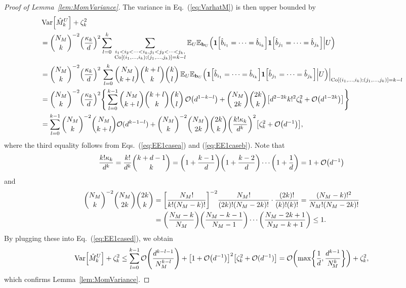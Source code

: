\documentclass[aps,prl,twocolumn,nofootinbib,superscriptaddress,10pt]{revtex4-2}
\let\originalleft\left
\let\originalright\right
\renewcommand{\left}{\mathopen{}\mathclose\bgroup\originalleft}
\renewcommand{\right}{\aftergroup\egroup\originalright}
\def\E{ {\mathbb E} } %
\DeclareMathOperator{\Var}{Var}
\newcommand{\bigo}[1]{\mathcal{O}\left(#1\right)}
\theoremstyle{plain}
\theoremstyle{definition}
\def\eqref#1{\textup{(\ref{#1})}}
\newcommand{\eref}[1]{Eq.~\textup{(\ref{#1})}}
\newcommand{\lref}[1]{Lemma~\ref{#1}}
\begin{document}
\begin{proof}[Proof of \lref{lem:MomVariance}]
The variance in \eref{eq:VarhatM}  is then upper bounded by
\begin{align}\label{eq:EE1cased}
&\Var\left[ \hat{M}_k^{U}\right] +\zeta_k^2
\nonumber\\
&=  
\binom{N_M}{k}^{-2} \left( \frac{\kappa_k}{d}\right)^2
\sum_{l=0}^{k} \,
\sum_{\substack{i_1<i_2<\dots<i_k, j_1<j_2<\dots<j_k, \\{\rm Co}[(i_1,\dots,i_k);(j_1,\dots,j_k)]=k-l }} 
\E_{U} \E_{\mathbf{b}_{U}} \Big(
\textbf{1}\left[\hat{b}_{i_1}=\dots=\hat{b}_{i_k}\right]  
\textbf{1}\left[\hat{b}_{j_1}=\dots=\hat{b}_{j_k}\right]  \Big| U \Big)
\nonumber\\
&= 
\binom{N_M}{k}^{-2} \left( \frac{\kappa_k}{d}\right)^2\,  
\sum_{l=0}^{k} 
\binom{N_M}{k+l} \binom{k+l}{k} \binom{k}{l} \, 
\E_{U} \E_{\mathbf{b}_{U}} \Big(
\textbf{1}\left[\hat{b}_{i_1}=\dots=\hat{b}_{i_k}\right]  
\textbf{1}\left[\hat{b}_{j_1}=\dots=\hat{b}_{j_k}\right]  \Big| U \Big)\Big|_{{\rm Co}[(i_1,\dots,i_k);(j_1,\dots,j_k)]=k-l}
\nonumber\\
&= 
\binom{N_M}{k}^{-2} \left( \frac{\kappa_k}{d}\right)^2
\left\lbrace \,  
\sum_{l=0}^{k-1} 
\binom{N_M}{k+l} \binom{k+l}{k} \binom{k}{l} \, 
\bigo{d^{1-k-l}}
+   
\binom{N_M}{2k} \binom{2k}{k}
\left[d^{2-2k} k!^2\zeta_k^2  +\bigo{d^{1-2k}}
\right]\right\rbrace 
\nonumber\\
&= 
\sum_{l=0}^{k-1}\binom{N_M}{k}^{-2}  
\binom{N_M}{k+l} \mathcal{O}(d^{k-1-l})
+ 
\binom{N_M}{k}^{-2}  \binom{N_M}{2k}\binom{2k}{k} \left( \frac{k!\kappa_k}{d^{k}} \right)^2 
\left[\zeta_k^2 
+ \bigo{d^{-1}}
\right], 
\end{align}
where the third equality follows from Eqs.~\eqref{eq:EE1casea} and \eqref{eq:EE1caseb}. 
Note that 
\begin{align}
\frac{k!\kappa_k}{d^{k}}
= \frac{k!}{d^{k}}\binom{k+d-1}{k}
= \left( 1+ \frac{k-1}{d} \right) \left( 1+ \frac{k-2}{d} \right) \cdots \left( 1+ \frac{1}{d} \right) 
= 1+\bigo{d^{-1}}
\end{align}
and 
\begin{align} 
	\binom{N_M}{k}^{-2}  \binom{N_M}{2k}\binom{2k}{k}
	&= \left[ \frac{N_M!}{k!(N_M-k)!}\right]^{-2}  \frac{N_M!}{(2k)!(N_M-2k)!} \cdot \frac{(2k)!}{(k)!(k)!}
	= \frac{(N_M-k)!^2}{N_M!(N_M-2k)!}  
	\nonumber\\
	&%
	= \left( \frac{N_M-k}{N_M}\right)  \left( \frac{N_M-k-1}{N_M-1}\right)  \cdots \left(\frac{N_M-2k+1}{N_M-k+1}\right) 
	\leq 1.
\end{align}
By plugging these into \eref{eq:EE1cased}, we obtain 
\begin{align}
\Var\left[ \hat{M}_k^{U}\right] +\zeta_k^2
\leq 
\sum_{l=0}^{k-1} \bigo{\frac{d^{k-l-1}}{N_M^{k-l}}} 
+ \left[1+\bigo{d^{-1}}\right]^2 \left[ \zeta_k^2 + \mathcal{O}(d^{-1})\right] 
= 
\bigo{\max\left\lbrace \frac{1}{d} ,\frac{d^{k-1}}{N_{\!M}^{k}}\right\rbrace  } 
+\zeta_k^2 ,
\end{align}
which confirms \lref{lem:MomVariance}. 
\end{proof}
\end{document}
